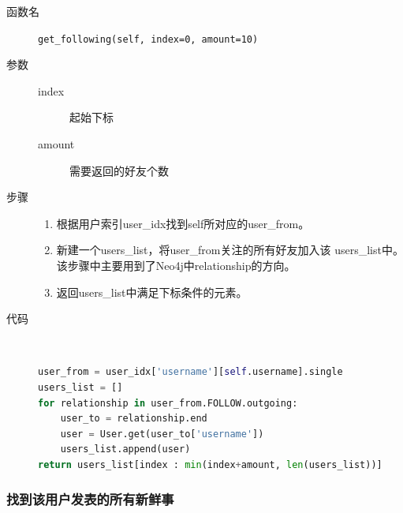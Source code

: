 \documentclass{yaldc}
\begin{document}
\begin{description}
    \item[函数名] \verb|get_following(self, index=0, amount=10)|
    \item[参数]
        \begin{description}
            \item[index] 起始下标
            \item[amount] 需要返回的好友个数
        \end{description}
    \item[步骤]
        \begin{enumerate}
            \item 根据用户索引user\_idx找到self所对应的user\_from。
            \item 新建一个users\_list，将user\_from关注的所有好友加入该
                users\_list中。该步骤中主要用到了Neo4j中relationship的方向。
            \item 返回users\_list中满足下标条件的元素。
        \end{enumerate}
    \item[代码] ~
        \begin{lstlisting}[language=Python]
user_from = user_idx['username'][self.username].single
users_list = []
for relationship in user_from.FOLLOW.outgoing:
    user_to = relationship.end
    user = User.get(user_to['username'])
    users_list.append(user)
return users_list[index : min(index+amount, len(users_list))]
        \end{lstlisting}
\end{description}

\subsubsection{找到该用户发表的所有新鲜事}
\end{document}

